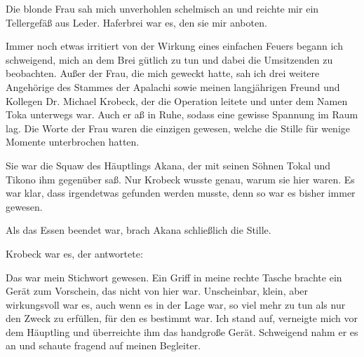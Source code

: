 Die blonde Frau sah mich unverhohlen schelmisch an und reichte mir ein Tellergefäß aus Leder. Haferbrei war es, den sie mir anboten.

Immer noch etwas irritiert von der Wirkung eines einfachen Feuers begann ich schweigend, mich an dem Brei gütlich zu tun und dabei die Umsitzenden zu beobachten. Außer der Frau, die mich geweckt hatte, sah ich drei weitere Angehörige des Stammes der Apalachi sowie meinen langjährigen Freund und Kollegen Dr. Michael Krobeck, der die Operation leitete und unter dem Namen Toka unterwegs war. Auch er aß in Ruhe, sodass eine gewisse Spannung im Raum lag. Die Worte der Frau waren die einzigen gewesen, welche die Stille für wenige Momente unterbrochen hatten.

Sie war die Squaw des Häuptlings Akana, der mit seinen Söhnen Tokal und Tikono ihm gegenüber saß. 
Nur Krobeck wusste genau, warum sie hier waren. Es war klar, dass irgendetwas gefunden werden musste, denn so war es bisher immer gewesen.

Als das Essen beendet war, brach Akana schließlich die Stille. 

Krobeck war es, der antwortete: 



Das war mein Stichwort gewesen. Ein Griff in meine rechte Tasche brachte ein Gerät zum Vorschein, das nicht von hier war. Unscheinbar, klein, aber wirkungsvoll war es, auch wenn es in der Lage war, so viel mehr zu tun als nur den Zweck zu erfüllen, für den es bestimmt war. 
Ich stand auf, verneigte mich vor dem Häuptling und überreichte ihm das handgroße Gerät. Schweigend nahm er es an und schaute fragend auf meinen Begleiter.


